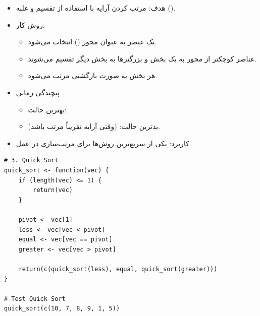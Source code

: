\documentclass[11pt, a4paper, oneside]{book}
\begin{document}
			
			\begin{itemize}
				
				\item {\large هدف}:
				مرتب کردن آرایه با استفاده از تقسیم و غلبه ().
				
				\item {\large روش کار}: \par
				
				\begin{itemize}
					
					\item یک عنصر به عنوان محور () انتخاب می‌شود.
					
					\item عناصر کوچکتر از محور به یک بخش و بزرگترها به بخش دیگر تقسیم می‌شوند.
					
					\item هر بخش به صورت بازگشتی مرتب می‌شود.
					
				\end{itemize}
				
				\item {\large پیچیدگی زمانی} \par
				
				\begin{itemize}
					
					\item بهترین حالت:
					
					\item بدترین حالت:
					 (وقتی آرایه تقریباً مرتب باشد).
					
				\end{itemize}
				
				\item {\large کاربرد}:
				یکی از سریع‌ترین روش‌ها برای مرتب‌سازی در عمل.
				
			\end{itemize}
			
			\begin{latin}
				\begin{lstlisting}[caption={\lr{Quick Sort}}] 
# 3. Quick Sort
quick_sort <- function(vec) {
	if (length(vec) <= 1) {
		return(vec)
	}
	
	pivot <- vec[1]
	less <- vec[vec < pivot]
	equal <- vec[vec == pivot]
	greater <- vec[vec > pivot]
	
	return(c(quick_sort(less), equal, quick_sort(greater)))
}

# Test Quick Sort
quick_sort(c(10, 7, 8, 9, 1, 5))

				\end{lstlisting}
			\end{latin}
			
\end{document}
